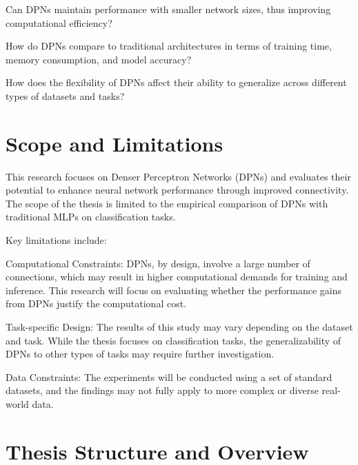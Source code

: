 Can DPNs maintain performance with smaller network sizes, thus improving computational efficiency?

How do DPNs compare to traditional architectures in terms of training time, memory consumption, and model accuracy?

How does the flexibility of DPNs affect their ability to generalize across different types of datasets and tasks?


\section{Scope and Limitations}

This research focuses on Denser Perceptron Networks (DPNs) and evaluates their potential to enhance neural network performance through improved connectivity. The scope of the thesis is limited to the empirical comparison of DPNs with traditional MLPs on classification tasks.

Key limitations include:

Computational Constraints: DPNs, by design, involve a large number of connections, which may result in higher computational demands for training and inference. This research will focus on evaluating whether the performance gains from DPNs justify the computational cost.

Task-specific Design: The results of this study may vary depending on the dataset and task. While the thesis focuses on classification tasks, the generalizability of DPNs to other types of tasks may require further investigation.

Data Constraints: The experiments will be conducted using a set of standard datasets, and the findings may not fully apply to more complex or diverse real-world data.



\section{Thesis Structure and Overview}

